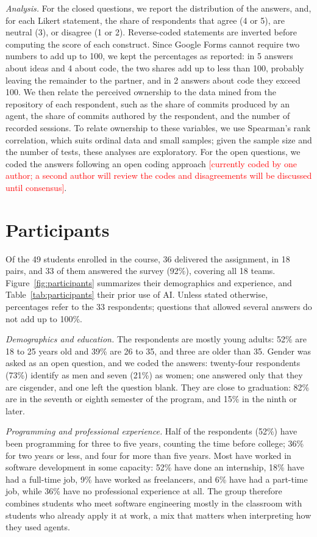 \documentclass[conference]{IEEEtran}
\newcommand{\tbd}[1]{\textcolor{red}{[#1]}}
\begin{document}
\emph{Analysis.} For the closed questions, we report the distribution of the answers, and, for each Likert statement, the share of respondents that agree (4 or 5), are neutral (3), or disagree (1 or 2). Reverse-coded statements are inverted before computing the score of each construct. Since Google Forms cannot require two numbers to add up to 100, we kept the percentages as reported: in 5 answers about ideas and 4 about code, the two shares add up to less than 100, probably leaving the remainder to the partner, and in 2 answers about code they exceed 100. We then relate the perceived ownership to the data mined from the repository of each respondent, such as the share of commits produced by an agent, the share of commits authored by the respondent, and the number of recorded sessions. To relate ownership to these variables, we use Spearman's rank correlation, which suits ordinal data and small samples; given the sample size and the number of tests, these analyses are exploratory. For the open questions, we coded the answers following an open coding approach \tbd{currently coded by one author; a second author will review the codes and disagreements will be discussed until consensus}.

\section{Participants}
\label{sec:participants}

Of the 49 students enrolled in the course, 36 delivered the assignment, in 18 pairs, and 33 of them answered the survey (92\%), covering all 18 teams. Figure~\ref{fig:participants} summarizes their demographics and experience, and Table~\ref{tab:participants} their prior use of AI. Unless stated otherwise, percentages refer to the 33 respondents; questions that allowed several answers do not add up to 100\%.

\emph{Demographics and education.} The respondents are mostly young adults: 52\% are 18 to 25 years old and 39\% are 26 to 35, and three are older than 35. Gender was asked as an open question, and we coded the answers: twenty-four respondents (73\%) identify as men and seven (21\%) as women; one answered only that they are cisgender, and one left the question blank. They are close to graduation: 82\% are in the seventh or eighth semester of the program, and 15\% in the ninth or later.

\emph{Programming and professional experience.} Half of the respondents (52\%) have been programming for three to five years, counting the time before college; 36\% for two years or less, and four for more than five years. Most have worked in software development in some capacity: 52\% have done an internship, 18\% have had a full-time job, 9\% have worked as freelancers, and 6\% have had a part-time job, while 36\% have no professional experience at all. The group therefore combines students who meet software engineering mostly in the classroom with students who already apply it at work, a mix that matters when interpreting how they used agents.
\end{document}
